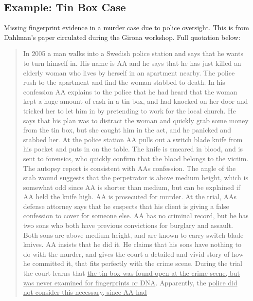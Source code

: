\documentclass[
  10pt,
  dvipsnames,enabledeprecatedfontcommands]{scrartcl}
\begin{document}
\hypertarget{example-tin-box-case}{%
\subsection{Example: Tin Box Case}\label{example-tin-box-case}}

Missing fingerprint evidence in a murder case due to police oversight.
This is from Dahlman's paper circulated during the Girona workshop.
Full quotation below:

\begin{quote}
In 2005 a man walks into a Swedish police station and says that he wants to turn himself in. His
name is AA and he says that he has just killed an elderly woman who lives by herself in an
apartment nearby. The police rush to the apartment and find the woman stabbed to death. In
his confession AA explains to the police that he had heard that the woman kept a huge amount
of cash in a tin box, and had knocked on her door and tricked her to let him in by pretending to
work for the local church. He says that his plan was to distract the woman and quickly grab
some money from the tin box, but she caught him in the act, and he panicked and stabbed her.
At the police station AA pulls out a switch blade knife from his pocket and puts in on the table.
The knife is smeared in blood, and is sent to forensics, who quickly confirm that the blood
belongs to the victim. The autopsy report is consistent with AAs confession. The angle of the
stab wound suggests that the perpetrator is above medium height, which is somewhat odd
since AA is shorter than medium, but can be explained if AA held the knife high. AA is
prosecuted for murder. At the trial, AAs defense attorney says that he suspects that his client
is giving a false confession to cover for someone else. AA has no criminal record, but he has
two sons who both have previous convictions for burglary and assault. Both sons are above
medium height, and are known to carry switch blade knives. AA insists that he did it. He claims
that his sons have nothing to do with the murder, and gives the court a detailed and vivid story
of how he committed it, that fits perfectly with the crime scene. During the trial the court
learns that \underline{the tin box was found open at the crime scene, but was never examined for
fingerprints or DNA}. Apparently, the \underline{police did not consider this necessary, since AA had
}
\end{quote}
\end{document}
